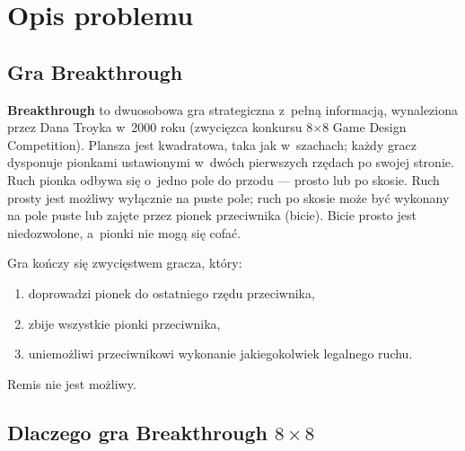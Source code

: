 \documentclass[12pt,a4paper]{article}
\begin{document}
\newpage

\section{Opis problemu}

\subsection{Gra Breakthrough}

\textbf{Breakthrough} to dwuosobowa gra strategiczna z~pełną informacją, wynaleziona przez Dana Troyka w~2000 roku (zwycięzca konkursu 8$\times$8 Game Design Competition). Plansza jest kwadratowa, taka jak w~szachach; każdy gracz dysponuje pionkami ustawionymi w~dwóch pierwszych rzędach po swojej stronie. Ruch pionka odbywa się o~jedno pole do przodu --- prosto lub po skosie. Ruch prosty jest możliwy wyłącznie na puste pole; ruch po skosie może być wykonany na pole puste lub zajęte przez pionek przeciwnika (bicie). Bicie prosto jest niedozwolone, a~pionki nie mogą się cofać.

Gra kończy się zwycięstwem gracza, który:
\begin{enumerate}[leftmargin=2em]
  \item doprowadzi pionek do ostatniego rzędu przeciwnika,
  \item zbije wszystkie pionki przeciwnika,
  \item uniemożliwi przeciwnikowi wykonanie jakiegokolwiek legalnego ruchu.
\end{enumerate}
Remis nie jest możliwy.

\subsection{Dlaczego gra Breakthrough $8\times8$}
\end{document}
